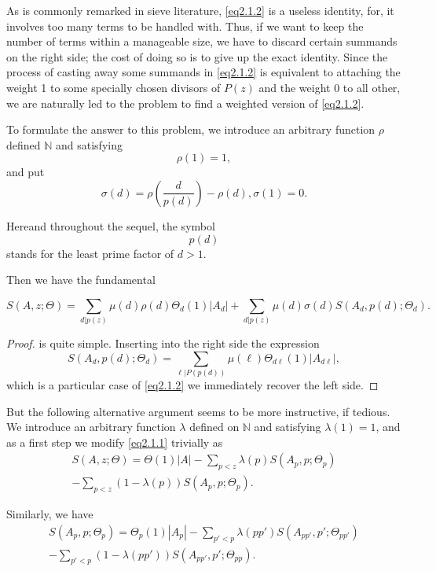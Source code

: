 As is commonly remarked in sieve literature, \eqref{eq2.1.2} is a useless
identity, for, it involves too many terms to be handled with. Thus, if
we want to keep the number of terms within a manageable size, we have
to discard certain summands on the right side; the cost of doing so is
to give up the exact identity. Since the process of casting away some
summands in \eqref{eq2.1.2} is equivalent to attaching the weight 1 to
some specially chosen divisors of $P(z)$ and the weight 0 to all
other, we are naturally led to the problem to find a weighted version
of \eqref{eq2.1.2}.  

To formulate the answer to this problem, we introduce an arbitrary
function $\rho$ defined $\mathbb{N}$ and satisfying 
 $$
 \rho (1) = 1,
 $$
and put
$$
\sigma (d) = \rho (\frac{d} {p(d)}) - \rho (d), \sigma(1) = 0.
$$

Here\pageoriginale and throughout the sequel, the symbol
$$
p(d)
$$
stands for the least prime factor of $d > 1$.

Then we have the fundamental

\begin{theorem}\label{chap2-thm6}%
$$
S (A, z; \Theta)= \sum_{d|p(z)} \mu (d) \rho(d) \Theta_d(1)|A_d| +
\sum_{d|p(z)} \mu (d) \sigma(d)S(A_d,p(d);\Theta_d). 
$$
\end{theorem}

\begin{proof}
is quite simple. Inserting into the right side the expression 
$$
S(A_d,p(d); \Theta_d) = \sum_{\ell| P(p(d))} \mu (\ell) \Theta_{d
  \ell}(1) |A_{d \ell}|, 
$$ 
which is a particular case of \eqref{eq2.1.2} we immediately recover
the left side. 
\end{proof}

But the following alternative argument seems to be more instructive,
if tedious. We introduce an arbitrary function $\lambda$ defined on
$\mathbb{N}$ and satisfying $\lambda(1)=1$, and as a first step we
modify \eqref{eq2.1.1} trivially as  
\begin{multline*}
  S(A,z;\Theta  )= \Theta(1) |A| - \sum_{p < z} \lambda(p)S(A_p,p;
  \Theta_p)\\
  - \sum_{p <z}(1- \lambda(p))S(A_p, p;
  \Theta_p). \tag{2.1.3} \label{eq2.1.3}
\end{multline*}

Similarly, we have 
\begin{multline*}
  S(A_p, p; \Theta_p)= \Theta_p(1)|A_p|- \sum_{p' < p}
  \lambda(pp')S(A_{pp'}, p';\Theta_{pp'})\\ 
  - \sum_{p' <p}(1- \lambda(pp'))
  S(A_{pp'}, p'; \Theta_{pp}). \tag{2.1.4} \label{eq2.1.4}
\end{multline*}

